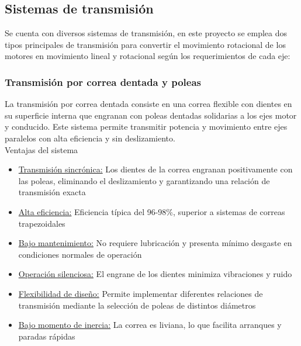 
\subsection{Sistemas de transmisión}

Se cuenta con diversos sistemas de transmisión, en este proyecto se emplea dos tipos principales de transmisión para convertir el movimiento rotacional de los motores en movimiento lineal y rotacional según los requerimientos de cada eje:

\subsubsection{Transmisión por correa dentada y poleas}

La transmisión por correa dentada consiste en una correa flexible con dientes en su superficie interna que engranan con poleas dentadas solidarias a los ejes motor y conducido. Este sistema permite transmitir potencia y movimiento entre ejes paralelos con alta eficiencia y sin deslizamiento.\\

Ventajas del sistema
\begin{itemize}[label=$\bullet$]
    \item \underline{Transmisión sincrónica:} Los dientes de la correa engranan positivamente con las poleas, eliminando el deslizamiento y garantizando una relación de transmisión exacta
    \item \underline{Alta eficiencia:} Eficiencia típica del 96-98\%, superior a sistemas de correas trapezoidales
    \item \underline{Bajo mantenimiento:} No requiere lubricación y presenta mínimo desgaste en condiciones normales de operación
    \item \underline{Operación silenciosa:} El engrane de los dientes minimiza vibraciones y ruido
    \item \underline{Flexibilidad de diseño:} Permite implementar diferentes relaciones de transmisión mediante la selección de poleas de distintos diámetros
    \item \underline{Bajo momento de inercia:} La correa es liviana, lo que facilita arranques y paradas rápidas\\
\end{itemize}

